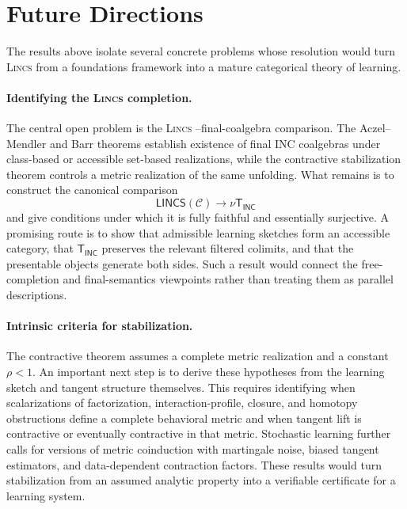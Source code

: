 \documentclass{article}
\newcommand{\C}{\mathcal{C}}
\newcommand{\T}{\mathsf{T}}
\newcommand{\LINCS}{\mathsf{LINCS}}
\newcommand{\INC}{\mathsf{INC}}
\begin{document}
\section{Future Directions}

The results above isolate several concrete problems whose resolution would turn
\textsc{Lincs}   from a foundations framework into a mature categorical theory of
learning.

\paragraph{Identifying the \textsc{Lincs}   completion.}
The central open problem is the \textsc{Lincs}  --final-coalgebra comparison.  The
Aczel--Mendler and Barr theorems establish existence of final INC coalgebras
under class-based or accessible set-based realizations, while the contractive
stabilization theorem controls a metric realization of the same unfolding.
What remains is to construct the canonical comparison
\[
\LINCS(\C)\longrightarrow\nu\T_{\INC}
\]
and give conditions under which it is fully faithful and essentially
surjective.  A promising route is to show that admissible learning sketches
form an accessible category, that \(\T_{\INC}\) preserves the relevant
filtered colimits, and that the presentable objects generate both sides.  Such
a result would connect the free-completion and final-semantics viewpoints
rather than treating them as parallel descriptions.

\paragraph{Intrinsic criteria for stabilization.}
The contractive theorem assumes a complete metric realization and a constant
\(\rho<1\).  An important next step is to derive these hypotheses from the
learning sketch and tangent structure themselves.  This requires identifying
when scalarizations of factorization, interaction-profile, closure, and homotopy obstructions define
a complete behavioral metric and when tangent lift is contractive or eventually
contractive in that metric.  Stochastic learning further calls for versions of
metric coinduction with martingale noise, biased tangent estimators, and
data-dependent contraction factors.  These results would turn stabilization
from an assumed analytic property into a verifiable certificate for a learning
system.
\end{document}
